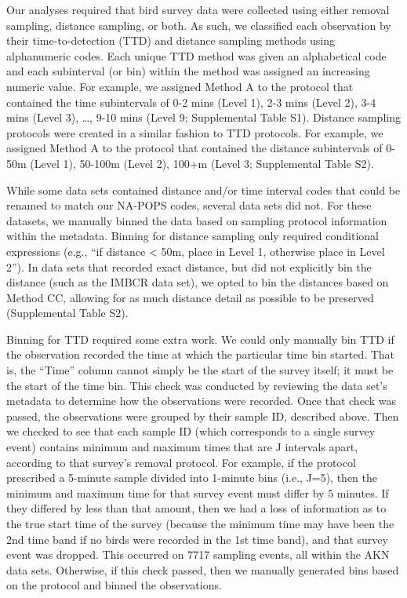 \par Our analyses required that bird survey data were collected using either removal sampling, distance sampling, or both. As such, we classified each observation by their time-to-detection (TTD) and distance sampling methods using alphanumeric codes. Each unique TTD method was given an alphabetical code and each subinterval (or bin) within the method was assigned an increasing numeric value. For example, we assigned Method A to the protocol that contained the time subintervals of 0-2 mins (Level 1), 2-3 mins (Level 2), 3-4 mins (Level 3), …, 9-10 mins (Level 9; Supplemental Table S1). Distance sampling protocols were created in a similar fashion to TTD protocols. For example, we assigned Method A to the protocol that contained the distance subintervals of 0-50m (Level 1), 50-100m (Level 2), 100+m (Level 3; Supplemental Table S2).

\par While some data sets contained distance and/or time interval codes that could be renamed to match our NA-POPS codes, several data sets did not. For these datasets, we manually binned the data based on sampling protocol information within the metadata. Binning for distance sampling only required conditional expressions (e.g., “if distance < 50m, place in Level 1, otherwise place in Level 2”). In data sets that recorded exact distance, but did not explicitly bin the distance (such as the IMBCR data set), we opted to bin the distances based on Method CC, allowing for as much distance detail as possible to be preserved (Supplemental Table S2). 

\par Binning for TTD required some extra work. We could only manually bin TTD if the observation recorded the time at which the particular time bin started. That is, the “Time” column cannot simply be the start of the survey itself; it must be the start of the time bin. This check was conducted by reviewing the data set’s metadata to determine how the observations were recorded. Once that check was passed, the observations were grouped by their sample ID, described above. Then we checked to see that each sample ID (which corresponds to a single survey event) contains minimum and maximum times that are J intervals apart, according to that survey’s removal protocol. For example, if the protocol prescribed a 5-minute sample divided into 1-minute bins (i.e., J=5), then the minimum and maximum time for that survey event must differ by 5 minutes. If they differed by less than that amount, then we had a loss of information as to the true start time of the survey (because the minimum time may have been the 2nd time band if no birds were recorded in the 1st time band), and that survey event was dropped. This occurred on 7717 sampling events, all within the AKN data sets. Otherwise, if this check passed, then we manually generated bins based on the protocol and binned the observations.

